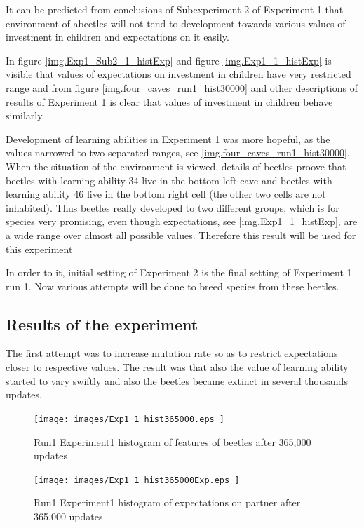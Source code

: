 \documentclass[a4paper,12pt]{report}
\begin{document}
It can be predicted from conclusions of Subexperiment 2 of Experiment 1 that environment of abeetles will not tend to development towards various values of investment in children and expectations on it easily. 

In figure \ref{img.Exp1_Sub2_1_histExp} and figure \ref{img.Exp1_1_histExp} is visible that values of expectations on investment in children have very restricted range and from figure \ref{img.four_caves_run1_hist30000} and other descriptions of results of Experiment 1 is clear that values of investment in children behave similarly.

Development of learning abilities in Experiment 1 was more hopeful, as the values narrowed to two separated ranges, see \ref{img.four_caves_run1_hist30000}. When the situation of the environment is viewed, details of beetles proove that beetles with learning ability 34 live in the bottom left cave and beetles with learning ability 46 live in the bottom right cell (the other two cells are not inhabited). Thus beetles really developed to two different groups, which is for species very promising, even though expectations, see \ref{img.Exp1_1_histExp}, are a wide range over almost all possible values. Therefore this result will be used for this experiment 

In order to it, initial setting of Experiment 2 is the final setting of Experiment 1 run 1. Now various attempts will be done to breed species from these beetles.

\subsection{Results of the experiment}

The first attempt was to increase mutation rate so as to restrict expectations closer to respective values. The result was that also the value of learning ability started to vary swiftly and also the beetles became extinct in several thousands updates.
 


\begin{figure}
\begin{center}
  \texttt{[image: images/Exp1\_1\_hist365000.eps ]}
  \caption{Run1 Experiment1 histogram of features of beetles after 365,000 updates}
  \label{img.Exp1_1_hist365000}
\end{center}
\end{figure}

\begin{figure}
\begin{center}
  \texttt{[image: images/Exp1\_1\_hist365000Exp.eps ]}
  \caption{Run1 Experiment1 histogram of expectations on partner after 365,000 updates}
  \label{img.Exp1_1_hist365000Exp}
\end{center}
\end{figure}
  
\end{document}

